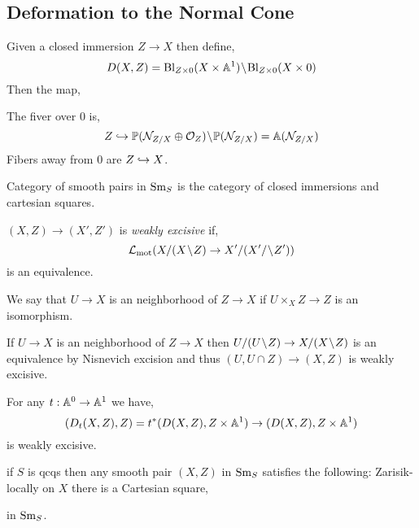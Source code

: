 \documentclass[12pt]{article}
\begin{document}
\subsection{Deformation to the Normal Cone}

Given a closed immersion $Z \to X$ then define,
\[ D(X, Z) = \mathrm{Bl}_{Z \times 0} (X \times \mathbb{A}^1) \! \setminus \! \mathrm{Bl}_{Z \times 0} (X \times 0) \]
Then the map,
\begin{center}
\end{center}
The fiver over $0$ is,
\[ Z \hookrightarrow \mathbb{P}(\mathcal{N}_{Z / X} \oplus \mathcal{O}_{Z}) \! \setminus \! \mathbb{P}(\mathcal{N}_{Z/X}) = \mathbb{A}(\mathcal{N}_{Z/X}) \]
Fibers away from $0$ are $Z \hookrightarrow X$. 

\begin{defn}
Category of smooth pairs in $\mathrm{Sm}_S$ is the category of closed immersions and cartesian squares.
\end{defn}

\begin{defn}
$(X, Z) \to (X', Z')$ is \textit{weakly excisive} if,
\[ \mathcal{L}_{\text{mot}} (X / (X \! \setminus \! Z) \to X'/(X'/\! \setminus \! Z')) \]
is an equivalence. 
\end{defn}

\begin{defn}
We say that $U \to X$ is an \etale neighborhood of $Z \to X$ if $U \times_X Z \to Z$ is an isomorphism. 
\end{defn}

\begin{rmk}
If $U \to X$ is an \etale neighborhood of $Z \to X$ then $U / (U \! \setminus \! Z) \to X / (X \! \setminus \! Z)$ is an equivalence by Nisnevich excision and thus $(U, U \cap Z) \to (X, Z)$ is weakly excisive. 
\end{rmk}


\begin{prop}
For any $t : \mathbb{A}^0 \to \mathbb{A}^1$ we have,
\[ (D_t(X, Z), Z) = t^* (D(X, Z), Z \times \mathbb{A}^1) \to (D(X, Z), Z \times \mathbb{A}^1) \]
is weakly excisive. 
\end{prop}

\begin{rmk}
if $S$ is qcqs then any smooth pair $(X, Z)$ in $\mathrm{Sm}_S$ satisfies the following: Zarisik-locally on $X$ there is a Cartesian square,
\begin{center}
\end{center}
in $\mathrm{Sm}_S$. 
\end{rmk}
\end{document}
